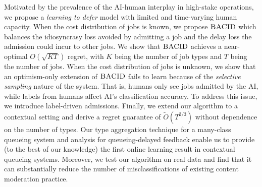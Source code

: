 Motivated by the prevalence of the AI-human interplay in high-stake operations, we propose a \emph{learning to defer} model with limited and time-varying human capacity. When the cost distribution of jobs is known, we propose $\textsc{BACID}$ which balances the idiosyncrasy loss avoided by admitting a job and the delay loss the admission could incur to other jobs. We show that $\textsc{BACID}$ achieves a near-optimal $O(\sqrt{KT})$ regret, with $K$ being the number of job types and $T$ being the number of jobs. When the cost distribution of jobs is unknown, we show that an optimism-only extension of $\textsc{BACID}$ fails to learn because of the \emph{selective sampling} nature of the system. That is, humans only see jobs admitted by the AI, while labels from humans affect AI's classification accuracy. To address this issue, we introduce label-driven admissions. Finally, we extend our algorithm to a contextual setting and derive a regret guarantee of $\tilde{O}(T^{2/3})$ without dependence on the number of types. Our type aggregation technique for a many-class queueing system and analysis for queueing-delayed feedback enable us to provide (to the best of our knowledge) the first online learning result in contextual queueing systems. Moreover, we test our algorithm on real data and find that it can substantially reduce the number of misclassifications of existing content moderation practice.


